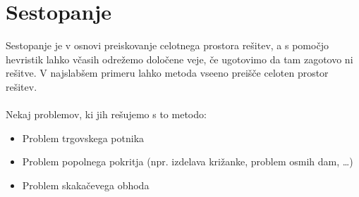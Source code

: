 \documentclass[10pt,a4paper,oneside]{book}
\newenvironment{items}{
\begin{itemize}
  \setlength{\itemsep}{1pt}
  \setlength{\parskip}{0pt}
  \setlength{\parsep}{0pt}
}{\end{itemize}}
\begin{document}
\section{Sestopanje}
Sestopanje je v osnovi preiskovanje celotnega prostora rešitev, a s pomočjo hevristik lahko včasih odrežemo določene veje, če ugotovimo da tam zagotovo ni rešitve. V najslabšem primeru lahko metoda vseeno preišče celoten prostor rešitev.\\
 \\
Nekaj problemov, ki jih rešujemo s to metodo:
\begin{items}
	\item Problem trgovskega potnika
	\item Problem popolnega pokritja (npr. izdelava križanke, problem osmih dam, \dots)
	\item Problem skakačevega obhoda
\end{items}
\end{document}
